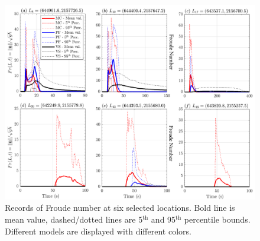 \documentclass{article}
\begin{document}
\begin{figure}[H]
         \centering
        \includegraphics[width=1\textwidth]{ancFigs/Colima/Froude_BAF.png}
        \caption{Records of Froude number at six selected locations. Bold line is mean value, dashed/dotted lines are 5$^{\mathrm{th}}$ and 95$^{\mathrm{th}}$ percentile bounds. Different models are displayed with different colors.}
        \label{fig:Colima-Fr1}
\end{figure}

\newpage
\end{document}
